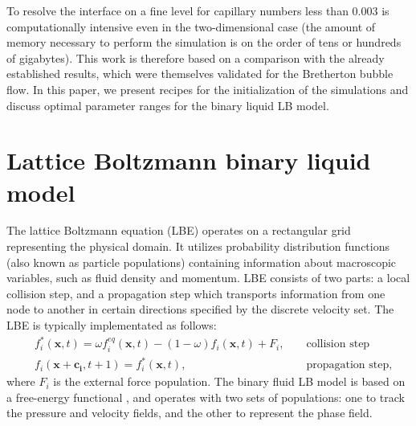 \documentclass{article}
\begin{document}
To resolve the interface on a fine level for capillary numbers less than
$0.003$ is computationally intensive even in the two-dimensional case
(the amount of memory necessary to perform the simulation is on the order
of tens or hundreds of gigabytes).  This work is therefore based on a
comparison with the already established results, which were themselves
validated for the Bretherton bubble flow.  In this paper, we present
recipes for the initialization of the simulations and discuss optimal
parameter ranges for the binary liquid LB model.

\section{Lattice Boltzmann binary liquid model}
The lattice Boltzmann equation (LBE) operates on a rectangular grid representing the
physical domain. It utilizes
probability distribution functions (also known as particle populations)
containing information about
macroscopic variables, such as fluid density and momentum. LBE consists of
two parts: a local collision step, and a propagation step which transports
information from one node to another in certain
directions specified by the discrete velocity set.
The LBE is typically implementated as follows:
\begin{equation}
\label{standard:implementation}
\begin{aligned}
&f_i^{*}(\bm{x},t)=\omega f_i^{eq}(\bm{x},t)-(1-\omega) f_i(\bm{x},t) +
F_i,&&\text{ collision step}\\
&f_i(\bm{x}+\bm{c_i},t+1)=f_i^{*}(\bm{x},t),&&\text{ propagation step}, 
\end{aligned}
\end{equation}
where $F_i$ is the external force population. The binary fluid LB model is
based on a free-energy functional \cite{swift,landau}, and operates with two
sets of populations: one to track the pressure and velocity fields, and the
other to represent the phase field.
\end{document}
